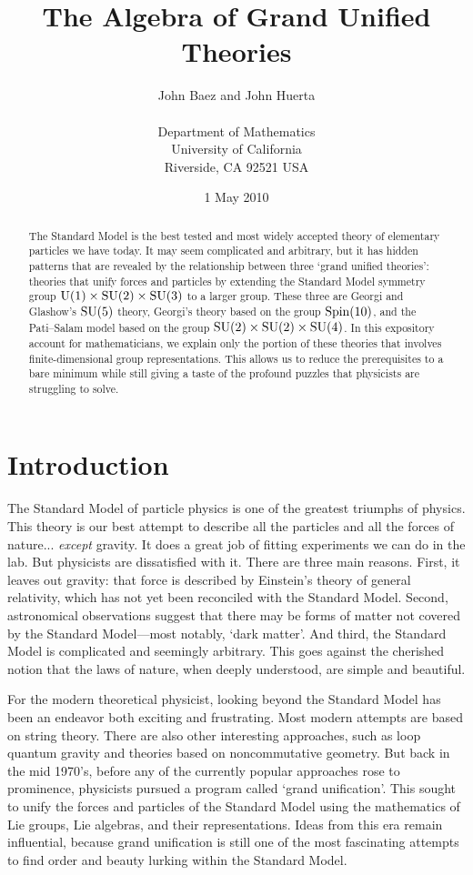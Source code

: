 \documentclass[12pt]{article}
\title{The Algebra of Grand Unified Theories}
\author{John Baez and John Huerta \\
\\
Department of Mathematics \\
University of California \\
Riverside, CA 92521 USA 
}
\date{ 1 May 2010}
\newcommand{\U}{{\rm U}}    %
\newcommand{\SU}{{\rm SU}}    %
\newcommand{\Spin}{{\rm Spin}}    %
\begin{document}
\maketitle

\begin{abstract}
The Standard Model is the best tested and most widely accepted theory of
elementary particles we have today.  It may seem complicated and arbitrary, but
it has hidden patterns that are revealed by the relationship between three
`grand unified theories': theories that unify forces and particles by extending
the Standard Model symmetry group $\U(1) \times \SU(2) \times \SU(3)$ to a
larger group.  These three are Georgi and Glashow's $\SU(5)$ theory,
Georgi's theory based on the group $\Spin(10)$, and the Pati--Salam model based
on the group $\SU(2) \times \SU(2) \times \SU(4)$.  In this expository account
for mathematicians, we explain only the portion of these theories that involves
finite-dimensional group representations.  This allows us to reduce the
prerequisites to a bare minimum while still giving a taste of the profound
puzzles that physicists are struggling to solve.
\end{abstract}

\section{Introduction} \label{sec:introduction}

The Standard Model of particle physics is one of the greatest triumphs
of physics.  This theory is our best attempt to describe all the
particles and all the forces of nature... \textit{except} gravity.  It
does a great job of fitting experiments we can do in the lab.  But
physicists are dissatisfied with it.  There are three main reasons.
First, it leaves out gravity: that force is described by Einstein's
theory of general relativity, which has not yet been reconciled with
the Standard Model.  Second, astronomical observations suggest that
there may be forms of matter not covered by the Standard Model---most
notably, `dark matter'.  And third, the Standard Model is complicated
and seemingly arbitrary.  This goes against the cherished notion that
the laws of nature, when deeply understood, are simple and beautiful.

For the modern theoretical physicist, looking beyond the Standard
Model has been an endeavor both exciting and frustrating.  Most modern
attempts are based on string theory.  There are also other interesting
approaches, such as loop quantum gravity and theories based on
noncommutative geometry.  But back in the mid 1970's, before any of
the currently popular approaches rose to prominence, physicists
pursued a program called `grand unification'.  This sought to unify
the forces and particles of the Standard Model using the mathematics
of Lie groups, Lie algebras, and their representations.  Ideas from
this era remain influential, because grand unification is still one of
the most fascinating attempts to find order and beauty lurking within
the Standard Model.
\end{document}
